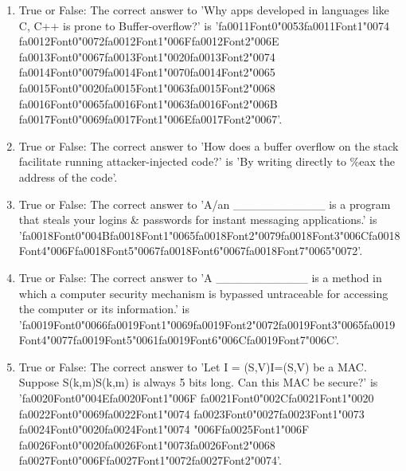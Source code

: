 \documentclass[12pt]{article}
\begin{document}
\begin{enumerate}[label=\arabic*.]
\item True or False: The correct answer to 'Why apps developed in languages like C, C++ is prone to Buffer-overflow?' is '{\csname fa0011Font0\endcsname\char"0053}{\csname fa0011Font1\endcsname\char"0074} {\csname fa0012Font0\endcsname\char"0072}{\csname fa0012Font1\endcsname\char"006F}{\csname fa0012Font2\endcsname\char"006E} {\csname fa0013Font0\endcsname\char"0067}{\csname fa0013Font1\endcsname\char"0020}{\csname fa0013Font2\endcsname\char"0074} {\csname fa0014Font0\endcsname\char"0079}{\csname fa0014Font1\endcsname\char"0070}{\csname fa0014Font2\endcsname\char"0065} {\csname fa0015Font0\endcsname\char"0020}{\csname fa0015Font1\endcsname\char"0063}{\csname fa0015Font2\endcsname\char"0068} {\csname fa0016Font0\endcsname\char"0065}{\csname fa0016Font1\endcsname\char"0063}{\csname fa0016Font2\endcsname\char"006B} {\csname fa0017Font0\endcsname\char"0069}{\csname fa0017Font1\endcsname\char"006E}{\csname fa0017Font2\endcsname\char"0067}'.
\item True or False: The correct answer to 'How does a buffer overflow on the stack facilitate running attacker-injected code?' is 'By writing directly to \%eax the address of the code'.
\item True or False: The correct answer to 'A/an \_\_\_\_\_\_\_\_\_\_\_ is a program that steals your logins \& passwords for instant messaging applications.' is '{\csname fa0018Font0\endcsname\char"004B}{\csname fa0018Font1\endcsname\char"0065}{\csname fa0018Font2\endcsname\char"0079}{\csname fa0018Font3\endcsname\char"006C}{\csname fa0018Font4\endcsname\char"006F}{\csname fa0018Font5\endcsname\char"0067}{\csname fa0018Font6\endcsname\char"0067}{\csname fa0018Font7\endcsname\char"0065}{\char"0072}'.
\item True or False: The correct answer to 'A \_\_\_\_\_\_\_\_\_\_\_ is a method in which a computer security mechanism is bypassed untraceable for accessing the computer or its information.' is '{\csname fa0019Font0\endcsname\char"0066}{\csname fa0019Font1\endcsname\char"0069}{\csname fa0019Font2\endcsname\char"0072}{\csname fa0019Font3\endcsname\char"0065}{\csname fa0019Font4\endcsname\char"0077}{\csname fa0019Font5\endcsname\char"0061}{\csname fa0019Font6\endcsname\char"006C}{\csname fa0019Font7\endcsname\char"006C}'.
\item True or False: The correct answer to 'Let I = (S,V)I=(S,V) be a MAC. Suppose S(k,m)S(k,m) is always 5 bits long. Can this MAC be secure?' is '{\csname fa0020Font0\endcsname\char"004E}{\csname fa0020Font1\endcsname\char"006F} {\csname fa0021Font0\endcsname\char"002C}{\csname fa0021Font1\endcsname\char"0020} {\csname fa0022Font0\endcsname\char"0069}{\csname fa0022Font1\endcsname\char"0074} {\csname fa0023Font0\endcsname\char"0027}{\csname fa0023Font1\endcsname\char"0073} {\csname fa0024Font0\endcsname\char"0020}{\csname fa0024Font1\endcsname\char"0074} {\char"006F}{\csname fa0025Font1\endcsname\char"006F} {\csname fa0026Font0\endcsname\char"0020}{\csname fa0026Font1\endcsname\char"0073}{\csname fa0026Font2\endcsname\char"0068} {\csname fa0027Font0\endcsname\char"006F}{\csname fa0027Font1\endcsname\char"0072}{\csname fa0027Font2\endcsname\char"0074}'.
\end{enumerate}
\end{document}
